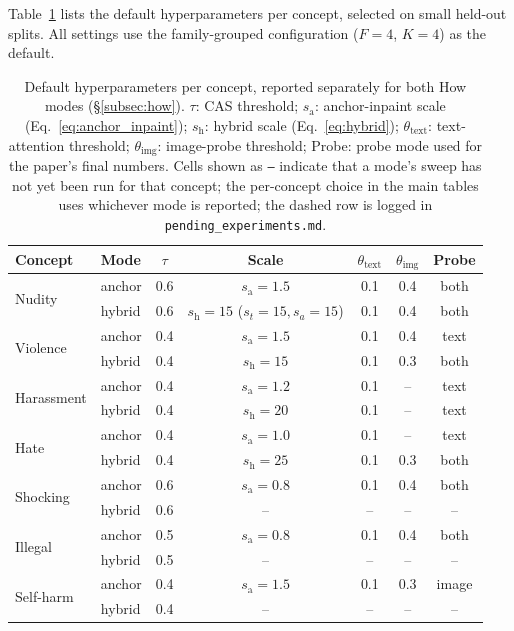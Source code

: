 Table~\ref{table:hyperparams} lists the default hyperparameters per concept, selected on small held-out splits. All settings use the family-grouped configuration ($F{=}4$, $K{=}4$) as the default.

\begin{table}[h]
\centering
\renewcommand{\arraystretch}{1.15}
\setlength{\tabcolsep}{0.45em}
\caption{Default hyperparameters per concept, reported separately for both How modes (\S\ref{subsec:how}). $\tau$: CAS threshold; $s_\text{a}$: anchor-inpaint scale (Eq.~\ref{eq:anchor_inpaint}); $s_\text{h}$: hybrid scale (Eq.~\ref{eq:hybrid}); $\theta_\text{text}$: text-attention threshold; $\theta_\text{img}$: image-probe threshold; Probe: probe mode used for the paper's final numbers. Cells shown as \texttt{--} indicate that a mode's sweep has not yet been run for that concept; the per-concept choice in the main tables uses whichever mode is reported; the dashed row is logged in \texttt{pending\_experiments.md}.}
\label{table:hyperparams}
\small
\begin{tabular}{@{}llccccc@{}}
\toprule
\textbf{Concept} & \textbf{Mode} & $\tau$ & \textbf{Scale} & $\theta_\text{text}$ & $\theta_\text{img}$ & \textbf{Probe} \\
\midrule
\multirow{2}{*}{Nudity}
 & anchor & 0.6 & $s_\text{a}{=}1.5$                    & 0.1 & 0.4 & both \\
 & hybrid & 0.6 & $s_\text{h}{=}15$ ($s_t{=}15,s_a{=}15$) & 0.1 & 0.4 & both \\
\midrule
\multirow{2}{*}{Violence}
 & anchor & 0.4 & $s_\text{a}{=}1.5$  & 0.1 & 0.4 & text \\
 & hybrid & 0.4 & $s_\text{h}{=}15$   & 0.1 & 0.3 & both \\
\midrule
\multirow{2}{*}{Harassment}
 & anchor & 0.4 & $s_\text{a}{=}1.2$  & 0.1 & --  & text \\
 & hybrid & 0.4 & $s_\text{h}{=}20$   & 0.1 & --  & text \\
\midrule
\multirow{2}{*}{Hate}
 & anchor & 0.4 & $s_\text{a}{=}1.0$  & 0.1 & --  & text \\
 & hybrid & 0.4 & $s_\text{h}{=}25$   & 0.1 & 0.3 & both \\
\midrule
\multirow{2}{*}{Shocking}
 & anchor & 0.6 & $s_\text{a}{=}0.8$  & 0.1 & 0.4 & both \\
 & hybrid & 0.6 & --                  & --  & --  & --   \\
\midrule
\multirow{2}{*}{Illegal}
 & anchor & 0.5 & $s_\text{a}{=}0.8$  & 0.1 & 0.4 & both \\
 & hybrid & 0.5 & --                  & --  & --  & --   \\
\midrule
\multirow{2}{*}{Self-harm}
 & anchor & 0.4 & $s_\text{a}{=}1.5$  & 0.1 & 0.3 & image \\
 & hybrid & 0.4 & --                  & --  & --  & --   \\
\bottomrule
\end{tabular}
\end{table}

